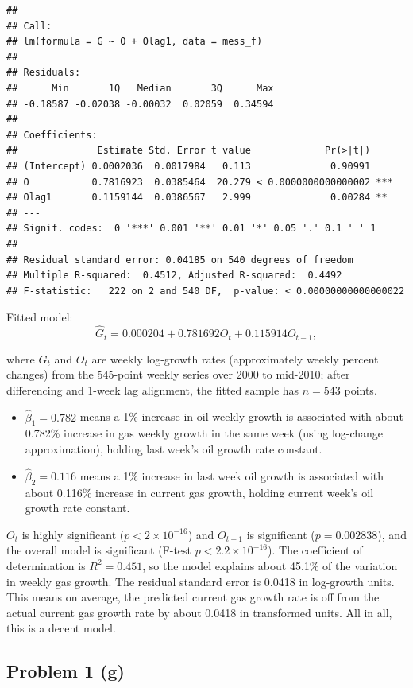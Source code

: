 \documentclass[
  10pt,
]{extarticle}
\providecommand{\tightlist}{%
  \setlength{\itemsep}{0pt}\setlength{\parskip}{0pt}}
\begin{document}
\begin{verbatim}
## 
## Call:
## lm(formula = G ~ O + Olag1, data = mess_f)
## 
## Residuals:
##      Min       1Q   Median       3Q      Max 
## -0.18587 -0.02038 -0.00032  0.02059  0.34594 
## 
## Coefficients:
##              Estimate Std. Error t value             Pr(>|t|)    
## (Intercept) 0.0002036  0.0017984   0.113              0.90991    
## O           0.7816923  0.0385464  20.279 < 0.0000000000000002 ***
## Olag1       0.1159144  0.0386567   2.999              0.00284 ** 
## ---
## Signif. codes:  0 '***' 0.001 '**' 0.01 '*' 0.05 '.' 0.1 ' ' 1
## 
## Residual standard error: 0.04185 on 540 degrees of freedom
## Multiple R-squared:  0.4512, Adjusted R-squared:  0.4492 
## F-statistic:   222 on 2 and 540 DF,  p-value: < 0.00000000000000022
\end{verbatim}

Fitted model:
\[
\widehat G_t = 0.000204 + 0.781692 O_t + 0.115914 O_{t-1},
\]

where \(G_t\) and \(O_t\) are weekly log-growth rates (approximately weekly percent changes) from the 545-point weekly series over 2000 to mid-2010; after differencing and 1-week lag alignment, the fitted sample has \(n=543\) points.

\begin{itemize}
\tightlist
\item
  \(\hat{\beta}_1=0.782\) means a 1\% increase in oil weekly growth is associated with about 0.782\% increase in gas weekly growth in the same week (using log-change approximation), holding last week's oil growth rate constant.
\item
  \(\hat{\beta}_2=0.116\) means a 1\% increase in last week oil growth is associated with about 0.116\% increase in current gas growth, holding current week's oil growth rate constant.
\end{itemize}

\(O_t\) is highly significant (\(p < 2\times 10^{-16}\)) and \(O_{t-1}\) is significant (\(p = 0.002838\)), and the overall model is significant (F-test \(p < 2.2\times 10^{-16}\)). The coefficient of determination is \(R^2 = 0.451\), so the model explains about 45.1\% of the variation in weekly gas growth. The residual standard error is 0.0418 in log-growth units. This means on average, the predicted current gas growth rate is off from the actual current gas growth rate by about 0.0418 in transformed units. All in all, this is a decent model.

\newpage

\subsection{Problem 1 (g)}\label{problem-1-g}
\end{document}
